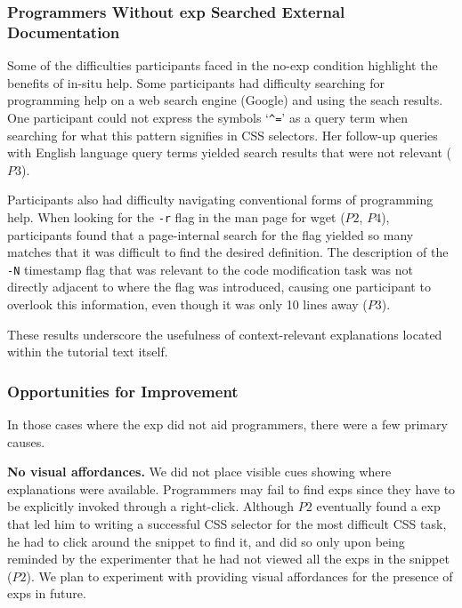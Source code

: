 \subsubsection{Programmers Without \Gls{exp} Searched External Documentation}

Some of the difficulties participants faced in the no-\gls{exp} condition  highlight the benefits of in-situ help.
Some participants had difficulty searching for programming help on a web search engine (Google) and using the seach results.
One participant could not express the symbols `\texttt{\^{}=}' as a query term when searching for what  this pattern signifies in CSS selectors.
Her follow-up queries with English language query terms  yielded search results that were not relevant ($P3$).

Participants also had difficulty navigating conventional forms of programming help.
When looking for the \texttt{-r} flag in the man page for wget ($P2$, $P4$), participants found that a page-internal  search for the flag yielded so many matches that it was difficult to find the desired definition.
The description of the \texttt{-N} timestamp flag that was relevant to the code modification task was not directly adjacent to where the flag was introduced, causing one participant to overlook this information, even though it was only 10 lines away ($P3$).

These results underscore the usefulness of context-relevant explanations located within the tutorial text itself.

\subsubsection{Opportunities for Improvement}
In those cases where the \gls{exp} did not aid programmers, there were a few primary causes.

{\bf No visual affordances.} We did not place  visible cues showing where explanations were available.
Programmers may fail to find \glspl{exp} since they have to be explicitly invoked through a right-click.
Although $P2$ eventually found a \gls{exp} that led him to writing a successful CSS selector for the most difficult CSS task, he had to click around the snippet to find it, and did so only upon being reminded by the experimenter that he had not viewed all the \glspl{exp} in the snippet ($P2$).  We plan to experiment with providing visual affordances for the presence of \glspl{exp} in future.


